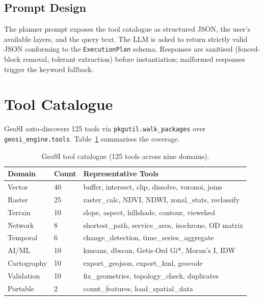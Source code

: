 \documentclass[11pt,a4paper]{article}
\begin{document}
\subsection{Prompt Design}
The planner prompt exposes the tool catalogue as structured JSON,
the user's available layers, and the query text. The LLM is asked to
return strictly valid JSON conforming to the \texttt{ExecutionPlan}
schema. Responses are sanitised (fenced-block removal, tolerant
extraction) before instantiation; malformed responses trigger the
keyword fallback.

\section{Tool Catalogue}
GeoSI auto-discovers 125 tools via \texttt{pkgutil.walk\_packages} over
\texttt{geosi\_engine.tools}. Table~\ref{tab:tools} summarises the
coverage.

\begin{table}[ht]
\centering
\caption{GeoSI tool catalogue (125 tools across nine domains).}
\label{tab:tools}
\begin{tabular}{@{}lll@{}}
\toprule
\textbf{Domain} & \textbf{Count} & \textbf{Representative Tools} \\
\midrule
Vector & 40 & buffer, intersect, clip, dissolve, voronoi, joins \\
Raster & 25 & raster\_calc, NDVI, NDWI, zonal\_stats, reclassify \\
Terrain & 10 & slope, aspect, hillshade, contour, viewshed \\
Network & 8 & shortest\_path, service\_area, isochrone, OD matrix \\
Temporal & 6 & change\_detection, time\_series\_aggregate \\
AI/ML & 10 & kmeans, dbscan, Getis-Ord Gi*, Moran's I, IDW \\
Cartography & 10 & export\_geojson, export\_kml, geocode \\
Validation & 10 & fix\_geometries, topology\_check, duplicates \\
Portable & 2 & count\_features, load\_spatial\_data \\
\bottomrule
\end{tabular}
\end{table}
\end{document}
